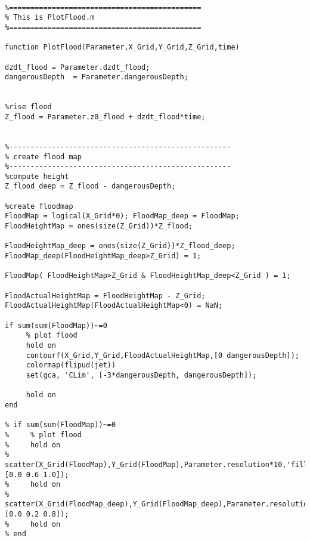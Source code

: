 \lstset{basicstyle=\footnotesize\ttfamily}
    
\begin{lstlisting}[breaklines]

%=============================================
% This is PlotFlood.m
%=============================================

function PlotFlood(Parameter,X_Grid,Y_Grid,Z_Grid,time)

dzdt_flood = Parameter.dzdt_flood;
dangerousDepth  = Parameter.dangerousDepth;


%rise flood
Z_flood = Parameter.z0_flood + dzdt_flood*time;


%----------------------------------------------------
% create flood map
%----------------------------------------------------
%compute height
Z_flood_deep = Z_flood - dangerousDepth;

%create floodmap
FloodMap = logical(X_Grid*0); FloodMap_deep = FloodMap;
FloodHeightMap = ones(size(Z_Grid))*Z_flood;

FloodHeightMap_deep = ones(size(Z_Grid))*Z_flood_deep;
FloodMap_deep(FloodHeightMap_deep>Z_Grid) = 1;

FloodMap( FloodHeightMap>Z_Grid & FloodHeightMap_deep<Z_Grid ) = 1;

FloodActualHeightMap = FloodHeightMap - Z_Grid;
FloodActualHeightMap(FloodActualHeightMap<0) = NaN;

if sum(sum(FloodMap))~=0
     % plot flood
     hold on
     contourf(X_Grid,Y_Grid,FloodActualHeightMap,[0 dangerousDepth]);
     colormap(flipud(jet)) 
     set(gca, 'CLim', [-3*dangerousDepth, dangerousDepth]);
     
     hold on
end

% if sum(sum(FloodMap))~=0
%     % plot flood
%     hold on
%     scatter(X_Grid(FloodMap),Y_Grid(FloodMap),Parameter.resolution*10,'filled','MarkerFaceColor',[0.0 0.6 1.0]);
%     hold on
%     scatter(X_Grid(FloodMap_deep),Y_Grid(FloodMap_deep),Parameter.resolution*20,'filled','MarkerFaceColor',[0.0 0.2 0.8]);
%     hold on
% end
\end{lstlisting}